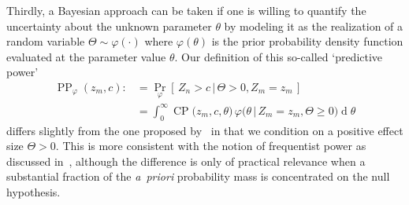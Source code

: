 \documentclass[12pt]{article}
\renewcommand{\Pr}{\operatorname{Pr}}
\newcommand{\CP}{\ensuremath{\operatorname{CP}}}
\newcommand{\PP}{\ensuremath{\operatorname{PP}}}
\renewcommand{\Pr}{\ensuremath{\operatorname{Pr}}}
\newcommand{\cond}{\ensuremath{\,|\,}}
\begin{document}
Thirdly, a Bayesian approach can be taken if one
is willing to quantify the uncertainty about the unknown parameter $\theta$ by modeling it as the
realization of a random variable $\Theta\sim\varphi(\cdot)$ where $\varphi(\theta)$ is the
prior probability density function evaluated at the parameter value $\theta$.
Our definition of this so-called `predictive power'
\begin{align}
    \PP_\varphi(z_m,c) :&= \Pr_\varphi[\,Z_n > c \cond \Theta >0, Z_m = z_m\,] \\
    &= \int_{0}^{\infty}\CP\big(z_m, c, \theta\big)\,\varphi\big(\theta\cond Z_m=z_m, \Theta\geq0\big)\operatorname{d}\theta
\end{align}
differs slightly from the one proposed by~\cite{spiegelhalter1994}
in that we condition on a positive effect size $\Theta>0$.
This is more consistent with the notion of frequentist power as discussed in~\cite{kunzmann2020}, although the difference is
only of practical relevance when a substantial
fraction of the \textit{a~priori} probability mass is concentrated on the null hypothesis.
\end{document}
